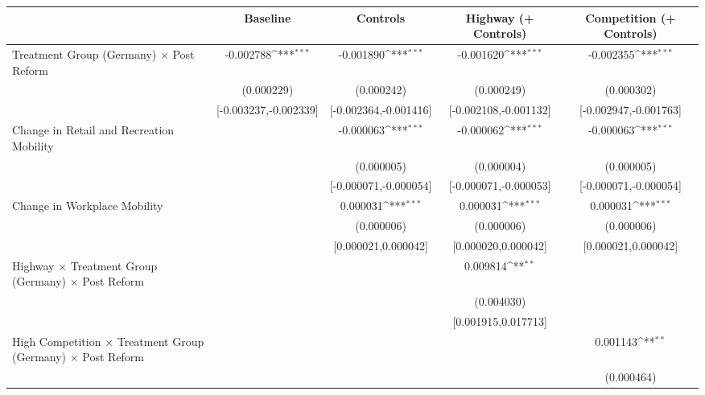 {
\def\sym#1{\ifmmode^{#1}\else\(^{#1}\)\fi}
\begin{tabular}{l*{4}{c}}
\toprule
                    &\multicolumn{1}{c}{Baseline}&\multicolumn{1}{c}{Controls}&\multicolumn{1}{c}{Highway (+ Controls)}&\multicolumn{1}{c}{Competition (+ Controls)}\\
\midrule
Treatment Group (Germany) $\times$ Post Reform&   -0.002788\sym{***}&   -0.001890\sym{***}&   -0.001620\sym{***}&   -0.002355\sym{***}\\
                    &  (0.000229)         &  (0.000242)         &  (0.000249)         &  (0.000302)         \\
                    &[-0.003237,-0.002339]         &[-0.002364,-0.001416]         &[-0.002108,-0.001132]         &[-0.002947,-0.001763]         \\
Change in Retail and Recreation Mobility&                     &   -0.000063\sym{***}&   -0.000062\sym{***}&   -0.000063\sym{***}\\
                    &                     &  (0.000005)         &  (0.000004)         &  (0.000005)         \\
                    &                     &[-0.000071,-0.000054]         &[-0.000071,-0.000053]         &[-0.000071,-0.000054]         \\
Change in Workplace Mobility&                     &    0.000031\sym{***}&    0.000031\sym{***}&    0.000031\sym{***}\\
                    &                     &  (0.000006)         &  (0.000006)         &  (0.000006)         \\
                    &                     &[0.000021,0.000042]         &[0.000020,0.000042]         &[0.000021,0.000042]         \\
Highway $\times$ Treatment Group (Germany) $\times$ Post Reform&                     &                     &    0.009814\sym{**} &                     \\
                    &                     &                     &  (0.004030)         &                     \\
                    &                     &                     &[0.001915,0.017713]         &                     \\
High Competition $\times$ Treatment Group (Germany) $\times$ Post Reform&                     &                     &                     &    0.001143\sym{**} \\
                    &                     &                     &                     &  (0.000464)         \\

\end{tabular}}
